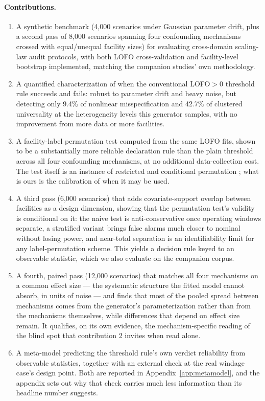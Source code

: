 \documentclass[journal=dce]{CUP-JNL-DTM}%
\begin{document}
\paragraph{Contributions.}
\begin{enumerate}
  \item A synthetic benchmark (4,000 scenarios under Gaussian parameter drift, plus a second pass of 8,000 scenarios spanning four confounding mechanisms crossed with equal/unequal facility sizes) for evaluating cross-domain scaling-law audit protocols, with both LOFO cross-validation and facility-level bootstrap implemented, matching the companion studies' own methodology.
  \item A quantified characterization of when the conventional LOFO$>0$ threshold rule succeeds and fails: robust to parameter drift and heavy noise, but detecting only 9.4\% of nonlinear misspecification and 42.7\% of clustered universality at the heterogeneity levels this generator samples, with no improvement from more data or more facilities.
  \item A facility-label permutation test computed from the same LOFO fits, shown to be a substantially more reliable declaration rule than the plain threshold across all four confounding mechanisms, at no additional data-collection cost. The test itself is an instance of restricted and conditional permutation \citep{anderson2003permutation,winkler2015multilevel,berrett2020conditional}; what is ours is the calibration of when it may be used.
  \item A third pass (6,000 scenarios) that adds covariate-support overlap between facilities as a design dimension, showing that the permutation test's validity is conditional on it: the naive test is anti-conservative once operating windows separate, a stratified variant brings false alarms much closer to nominal without losing power, and near-total separation is an identifiability limit for any label-permutation scheme. This yields a decision rule keyed to an observable statistic, which we also evaluate on the companion corpus.
  \item A fourth, paired pass (12,000 scenarios) that matches all four mechanisms on a common effect size --- the systematic structure the fitted model cannot absorb, in units of noise --- and finds that most of the pooled spread between mechanisms comes from the generator's parameterization rather than from the mechanisms themselves, while differences that depend on effect size remain. It qualifies, on its own evidence, the mechanism-specific reading of the blind spot that contribution 2 invites when read alone.
  \item A meta-model predicting the threshold rule's own verdict reliability from observable statistics, together with an external check at the real windage case's design point. Both are reported in Appendix~\ref{app:metamodel}, and the appendix sets out why that check carries much less information than its headline number suggests.
\end{enumerate}
\end{document}

